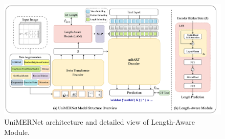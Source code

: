 \documentclass[runningheads]{llncs}
\begin{document}
\begin{figure}[tb]
  \centering
	\includegraphics[width=0.98 \linewidth]{figures/fig4_UniMERNet.png}
    \caption{UniMERNet architecture and detailed view of Length-Aware Module.}
  \label{fig3:archtecture}
  \vspace{-4pt}
\end{figure}
\end{document}

